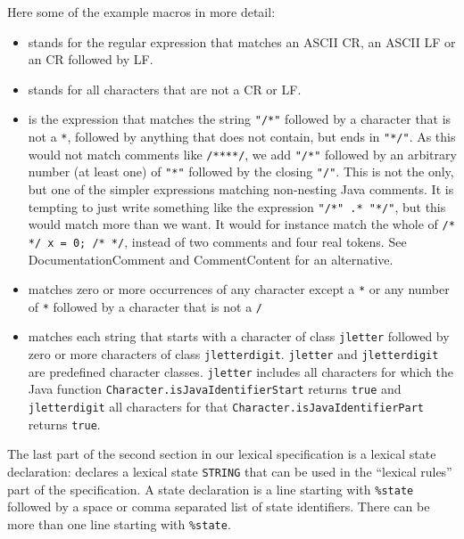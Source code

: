 \documentclass[11pt]{scrartcl}
\begin{document}
Here some of the example macros in more detail:
\begin{itemize}
\item
  \texttt{} stands for the regular
  expression that matches an ASCII CR, an ASCII LF or an CR followed by LF.

\item
  \texttt{} stands for all characters
  that are not a CR or LF.

\item
  \texttt{} is the expression
  that matches the string \texttt{"/*"} followed by a character that
  is not a \texttt{*}, followed by anything that does not contain, but
  ends in \texttt{"*/"}.  As this would not match comments like
  \texttt{/****/}, we add \texttt{"/*"} followed by an arbitrary
  number (at least one) of \texttt{"*"} followed by the closing
  \texttt{"/"}. This is not the only, but one of the simpler
  expressions matching non-nesting Java comments. It is tempting to
  just write something like the expression \texttt{"/*" .* "*/"}, but
  this would match more than we want. It would for instance match the
  whole of \texttt{/* */ x = 0; /* */}, instead of two comments and
  four real tokens. See DocumentationComment and CommentContent for an
  alternative.

\item
  \texttt{} matches zero or more
  occurrences of any character except a \texttt{*} or any number of 
  \texttt{*} followed by a character that is not a \texttt{/}

\item
  \texttt{} matches each string that
  starts with a character of class \texttt{jletter} followed by zero or more characters
  of class \texttt{jletterdigit}. \texttt{jletter} and \texttt{jletterdigit}
  are predefined character classes.  \texttt{jletter} includes all characters for which
  the Java function \texttt{Character.isJavaIdentifierStart} returns \texttt{true} and 
  \texttt{jletterdigit} all characters for that \texttt{Character.isJavaIdentifierPart}
  returns \texttt{true}. 
\end{itemize}
\label{ExampleStateDecl}

The last part of the second section in our
lexical specification is a lexical state declaration: 
\texttt{}
declares a lexical state \texttt{STRING} that can be
used in the ``lexical rules'' part of the specification. A state declaration
is a line starting with \texttt{\%state} followed by a space or comma
separated list of state identifiers. There can be more than one line starting
with \texttt{\%state}.
\end{document}
